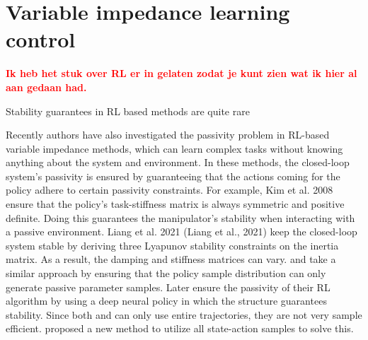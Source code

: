 \section{Variable impedance learning control}





\textbf{\textcolor{red}{Ik heb het stuk over RL er in gelaten zodat je kunt zien wat ik hier al aan gedaan had.}}

Stability guarantees in RL based methods are quite rare \cite{abdulkhaderDataDrivenMethodsContactRich2021}


Recently authors have also investigated the passivity problem in RL-based variable impedance methods, which can learn complex tasks without knowing anything about the system and environment. In these methods, the closed-loop system's passivity is ensured by guaranteeing that the actions coming for the policy adhere to certain passivity constraints. For example, Kim et al. 2008 \cite{kimLearningRobotStiffness2008} ensure that the policy's task-stiffness matrix is always symmetric and positive definite. Doing this guarantees the manipulator's stability when interacting with a passive environment. Liang et al. 2021 (Liang et al., 2021) keep the closed-loop system stable by deriving three Lyapunov stability constraints on the inertia matrix. As a result, the damping and stiffness matrices can vary.\cite{reyLearningMotionsDemonstrations2018} and \cite{khaderStabilityGuaranteedReinforcementLearning2020} take a similar approach by ensuring that the policy sample distribution can only generate passive parameter samples. Later \cite{khaderLearningDeepEnergy2021} ensure the passivity of their RL algorithm by using a deep neural policy in which the structure guarantees stability. Since both \cite{khaderStabilityGuaranteedReinforcementLearning2020,reyLearningMotionsDemonstrations2018} and \cite{khaderLearningDeepEnergy2021} can only use entire trajectories, they are not very sample efficient. \cite{khaderLearningStableNormalizingFlow2021} proposed a new method to utilize all state-action samples to solve this.
